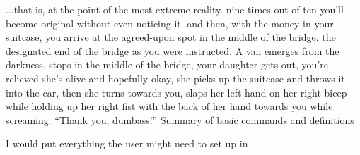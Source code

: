 {{{{%
%
...that is, at the point of the most extreme reality.
%
%
%
%
%
%
%
nine times out of ten you'll become original without even noticing it. 
%
%
%
and then, with the money in your suitcase, you arrive at the agreed-upon spot in the middle of the bridge. 
the designated end of the bridge as you were instructed. A van emerges from the darkness, stops in the middle of the bridge, 
your daughter gets out, you're relieved she's alive and hopefully okay, she picks up the suitcase and throws it 
into the car, then she turns towards you, slaps her left hand on her right bicep while holding up 
her right fist with the back of her hand towards you while screaming: “Thank you, dumbass!” 
%
%
%
%
%
%
\sec[sum] Summary of basic commands and definitions

I would put everything the user might need to set up in %

}}}}
